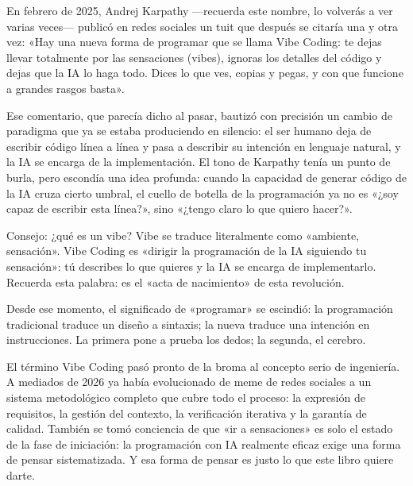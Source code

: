 


En febrero de 2025, Andrej Karpathy —recuerda este nombre, lo volverás a ver varias veces— publicó en redes sociales un tuit que después se citaría una y otra vez: «Hay una nueva forma de programar que se llama Vibe Coding: te dejas llevar totalmente por las sensaciones (vibes), ignoras los detalles del código y dejas que la IA lo haga todo. Dices lo que ves, copias y pegas, y con que funcione a grandes rasgos basta».

Ese comentario, que parecía dicho al pasar, bautizó con precisión un cambio de paradigma que ya se estaba produciendo en silencio: el ser humano deja de escribir código línea a línea y pasa a describir su intención en lenguaje natural, y la IA se encarga de la implementación. El tono de Karpathy tenía un punto de burla, pero escondía una idea profunda: cuando la capacidad de generar código de la IA cruza cierto umbral, el cuello de botella de la programación ya no es «¿soy capaz de escribir esta línea?», sino «¿tengo claro lo que quiero hacer?».

\begin{tcbinfo}{Consejo: ¿qué es un vibe?}
Vibe se traduce literalmente como «ambiente, sensación». Vibe Coding es «dirigir la programación de la IA siguiendo tu sensación»: tú describes lo que quieres y la IA se encarga de implementarlo. Recuerda esta palabra: es el «acta de nacimiento» de esta revolución.

\end{tcbinfo}

Desde ese momento, el significado de «programar» se escindió: la programación tradicional traduce un diseño a sintaxis; la nueva traduce una intención en instrucciones. La primera pone a prueba los dedos; la segunda, el cerebro.

El término Vibe Coding pasó pronto de la broma al concepto serio de ingeniería. A mediados de 2026 ya había evolucionado de meme de redes sociales a un sistema metodológico completo que cubre todo el proceso: la expresión de requisitos, la gestión del contexto, la verificación iterativa y la garantía de calidad. También se tomó conciencia de que «ir a sensaciones» es solo el estado de la fase de iniciación: la programación con IA realmente eficaz exige una forma de pensar sistematizada. Y esa forma de pensar es justo lo que este libro quiere darte.

